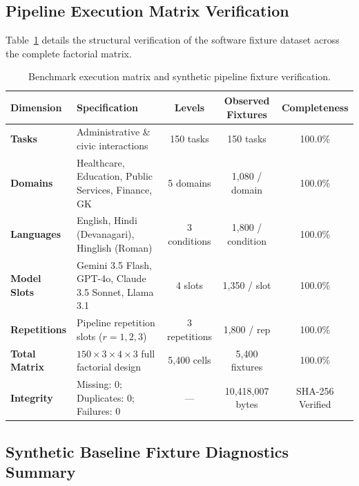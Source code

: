 \documentclass[11pt,a4paper]{article}
\begin{document}
\subsection{Pipeline Execution Matrix Verification}
\label{sec:pipeline_verification}

Table~\ref{tab:execution_matrix} details the structural verification of the software fixture dataset across the complete factorial matrix.

\begin{table}[htbp]
\centering
\small
\begin{tabularx}{\textwidth}{l X c c c}
\toprule
\textbf{Dimension} & \textbf{Specification} & \textbf{Levels} & \textbf{Observed Fixtures} & \textbf{Completeness} \\
\midrule
\textbf{Tasks} & Administrative \& civic interactions & 150 tasks & 150 tasks & 100.0\% \\
\textbf{Domains} & Healthcare, Education, Public Services, Finance, GK & 5 domains & 1,080 / domain & 100.0\% \\
\textbf{Languages} & English, Hindi (Devanagari), Hinglish (Roman) & 3 conditions & 1,800 / condition & 100.0\% \\
\textbf{Model Slots} & Gemini 3.5 Flash, GPT-4o, Claude 3.5 Sonnet, Llama 3.1 & 4 slots & 1,350 / slot & 100.0\% \\
\textbf{Repetitions} & Pipeline repetition slots ($r=1, 2, 3$) & 3 repetitions & 1,800 / rep & 100.0\% \\
\midrule
\textbf{Total Matrix} & $150 \times 3 \times 4 \times 3$ full factorial design & 5,400 cells & 5,400 fixtures & 100.0\% \\
\textbf{Integrity} & Missing: 0; Duplicates: 0; Failures: 0 & --- & 10,418,007 bytes & SHA-256 Verified \\
\bottomrule
\end{tabularx}
\caption{Benchmark execution matrix and synthetic pipeline fixture verification.}
\label{tab:execution_matrix}
\end{table}

\subsection{Synthetic Baseline Fixture Diagnostics Summary}
\label{sec:fixture_diagnostics_summary}
\end{document}
